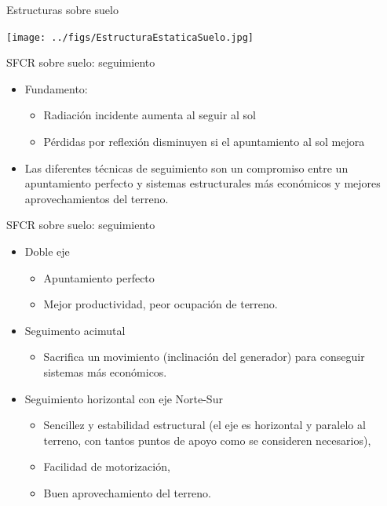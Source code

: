 \documentclass[xcolor={usenames,svgnames,dvipsnames}]{beamer}
\begin{document}
\begin{frame}[label={sec:org00f52e3}]{Estructuras sobre suelo}
\begin{center}
\texttt{[image: ../figs/EstructuraEstaticaSuelo.jpg]}
\end{center}
\end{frame}

\begin{frame}[label={sec:orgaacab53}]{SFCR sobre suelo: seguimiento}
\begin{itemize}
\item \alert{Fundamento:}

\begin{itemize}
\item Radiación incidente aumenta al seguir al sol

\item Pérdidas por reflexión disminuyen si el apuntamiento al sol mejora
\end{itemize}

\item Las diferentes técnicas de seguimiento son un compromiso entre un
apuntamiento perfecto y sistemas estructurales más económicos y
mejores aprovechamientos del terreno.
\end{itemize}
\end{frame}

\begin{frame}[label={sec:orgb8704a4}]{SFCR sobre suelo: seguimiento}
\begin{itemize}
\item \alert{Doble eje}

\begin{itemize}
\item Apuntamiento \guillemotleft{}perfecto\guillemotright{}

\item Mejor productividad, peor ocupación de terreno.
\end{itemize}

\item \alert{Seguimento acimutal}

\begin{itemize}
\item Sacrifica un movimiento (inclinación del generador) para conseguir
sistemas más económicos.
\end{itemize}

\item \alert{Seguimiento horizontal con eje Norte-Sur}

\begin{itemize}
\item Sencillez y estabilidad estructural (el eje es horizontal y
paralelo al terreno, con tantos puntos de apoyo como se consideren
necesarios),

\item Facilidad de motorización,

\item Buen aprovechamiento del terreno.
\end{itemize}
\end{itemize}
\end{frame}
\end{document}
